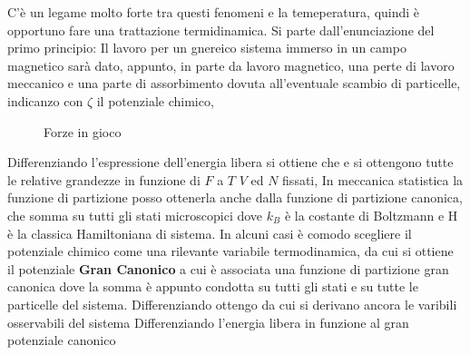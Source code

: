 \documentclass[a4paper,12pt]{article}
\begin{document}
C'è un legame molto forte tra questi fenomeni e la temeperatura, quindi è opportuno fare una trattazione termidinamica. Si parte dall'enunciazione del primo principio:
Il lavoro per un gnereico sistema immerso in un campo magnetico sarà dato, appunto, in parte da lavoro magnetico, una perte di lavoro meccanico e una parte di assorbimento dovuta all'eventuale scambio di particelle, indicanzo con $\zeta$ il potenziale chimico, 
\begin{figure}
	\usetikzlibrary{arrows}
	\centering
	\caption{Forze in gioco}
	\label{Lorenz}
\end{figure}
Differenziando l'espressione dell'energia libera si ottiene che
e si ottengono tutte le relative grandezze in funzione di $F$ a $T$ $V$ ed $N$ fissati,
In meccanica statistica la funzione di partizione posso ottenerla anche dalla funzione di partizione canonica, che somma su tutti gli stati microscopici
dove $k_B$ è la costante di Boltzmann e H è la classica Hamiltoniana di sistema. In alcuni casi è comodo scegliere il potenziale chimico come una rilevante variabile termodinamica, da cui si ottiene il potenziale \textbf{Gran Canonico}
a cui è associata una funzione di partizione gran canonica
dove la somma è appunto condotta su tutti gli stati e su tutte le particelle del sistema. Differenziando ottengo
da cui si derivano ancora le varibili osservabili del sistema
Differenziando l'energia libera in funzione al gran potenziale canonico
\end{document}
